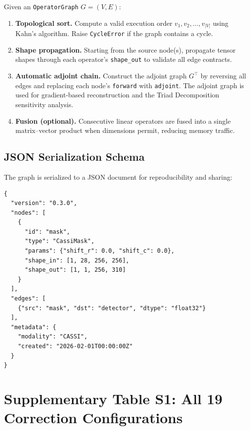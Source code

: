 \documentclass[11pt]{article}
\begin{document}
Given an \texttt{OperatorGraph} $G = (V, E)$:

\begin{enumerate}
  \item \textbf{Topological sort.}  Compute a valid execution order
        $v_1, v_2, \ldots, v_{|V|}$ using Kahn's algorithm.
        Raise \texttt{CycleError} if the graph contains a cycle.
  \item \textbf{Shape propagation.}  Starting from the source node(s), propagate
        tensor shapes through each operator's \texttt{shape\_out} to validate
        all edge contracts.
  \item \textbf{Automatic adjoint chain.}  Construct the adjoint graph
        $G^\top$ by reversing all edges and replacing each node's
        \texttt{forward} with \texttt{adjoint}.  The adjoint graph is used for
        gradient-based reconstruction and the Triad Decomposition sensitivity analysis.
  \item \textbf{Fusion (optional).}  Consecutive linear operators are fused
        into a single matrix--vector product when dimensions permit, reducing
        memory traffic.
\end{enumerate}

\subsection{JSON Serialization Schema}

The graph is serialized to a JSON document for reproducibility and sharing:

\begin{verbatim}
{
  "version": "0.3.0",
  "nodes": [
    {
      "id": "mask",
      "type": "CassiMask",
      "params": {"shift_r": 0.0, "shift_c": 0.0},
      "shape_in": [1, 28, 256, 256],
      "shape_out": [1, 1, 256, 310]
    }
  ],
  "edges": [
    {"src": "mask", "dst": "detector", "dtype": "float32"}
  ],
  "metadata": {
    "modality": "CASSI",
    "created": "2026-02-01T00:00:00Z"
  }
}
\end{verbatim}

\newpage

\section{Supplementary Table S1: All 19 Correction Configurations}
\label{sec:params}
\end{document}
